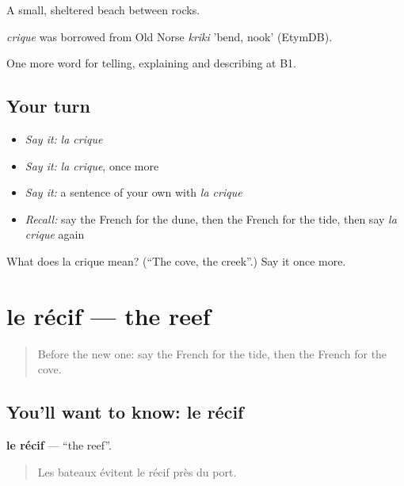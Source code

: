 A small, sheltered beach between rocks.

\begin{cousinweb}
\emph{crique} was borrowed from Old Norse \emph{kriki} 'bend, nook' (EtymDB).
\end{cousinweb}

\begin{grammarlens}[title={What you've built}]
One more word for telling, explaining and describing at B1.
\end{grammarlens}

\subsection*{Your turn}
\begin{itemize}
\raggedright
  \item \emph{Say it:} \emph{la crique}
  \item \emph{Say it:} \emph{la crique}, once more
  \item \emph{Say it:} a sentence of your own with \emph{la crique}
  \item \emph{Recall:} say the French for the dune, then the French for the tide, then say \emph{la crique} again
\end{itemize}

\begin{tcolorbox}[breakable,colback=teal!4,colframe=teal!35!black,title={Before you move on}]
What does la crique mean? (\textquotedblleft{}The cove, the creek\textquotedblright{}.) Say it once more.
\end{tcolorbox}
\section[le récif]{le récif — the reef}

\label{lesson:FR-C458-recif}



\begin{quote}
Before the new one: say the French for the tide, then the French for the cove.
\end{quote}

\subsection*{You'll want to know: le récif}
\textbf{le récif} — \textquotedblleft{}the reef\textquotedblright{}.

\begin{quote}
Les bateaux évitent le récif près du port.
\end{quote}

